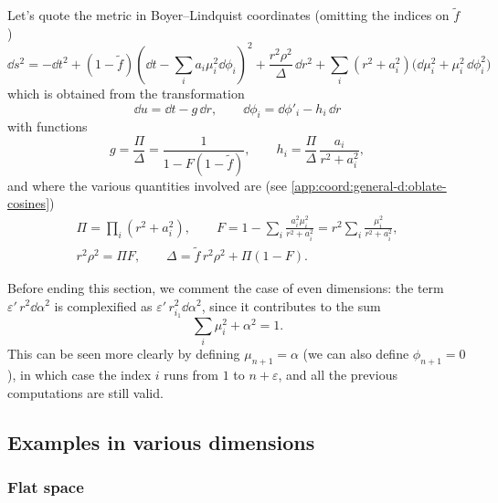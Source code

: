 Let's quote the metric in Boyer--Lindquist coordinates (omitting the indices on $\tilde f$)~\cite{Myers:1986:BlackHolesHigher}
\begin{equation}
	\label{higher-jna:metric:rotating:result-jna-bl}
	\dd s^2 = - \dd t^2
		+ (1 - \tilde f) \left(\dd t - \sum_i a_i \mu_i^2 \dd \phi_i \right)^2
		+ \frac{r^2 \rho^2}{\Delta}\, \dd r^2
		+ \sum_i (r^2 + a_i^2) \Big(\dd \mu_i^2 + \mu_i^2\, \dd \phi_i^2 \Big)
\end{equation} 
which is obtained from the transformation
\begin{equation}
	\dd u = \dd t - g\, \dd r, \qquad
	\dd \phi_i = \dd \phi'_i - h_i\, \dd r
\end{equation} 
with functions
\begin{equation}
\label{higher-jna:change:rotating:higher-dim-func-gh}
	g = \frac{\Pi}{\Delta}
		= \frac{1}{1 - F (1 - \tilde f)}, \qquad
	h_i = \frac{\Pi}{\Delta} \, \frac{a_i}{r^2 + a_i^2},
\end{equation}
and where the various quantities involved are (see \cref{app:coord:general-d:oblate-cosines})
\begin{equation}
	\label{higher-jna:metric:rotating:result-jna-bl-parameters}
	\begin{gathered}
		\Pi = \prod_i (r^2 + a_i^2), \qquad
		F = 1 - \sum_i \frac{a_i^2 \mu_i^2}{r^2 + a_i^2} = r^2 \sum_i \frac{\mu_i^2}{r^2 + a_i^2}, \\
		r^2 \rho^2 = \Pi F, \qquad
		\Delta = \tilde f\, r^2 \rho^2 + \Pi (1 - F).
	\end{gathered}
\end{equation}

Before ending this section, we comment the case of even dimensions: the term $\varepsilon'\, r^2 \dd \alpha^2$ is complexified as $\varepsilon'\, r_{i_1}^2 \dd \alpha^2$, since it contributes to the sum
\begin{equation}
	\sum_i \mu_i^2 + \alpha^2 = 1.
\end{equation} 
This can be seen more clearly by defining $\mu_{n+1} = \alpha$ (we can also define $\phi_{n+1} = 0$), in which case the index $i$ runs from $1$ to $n+\varepsilon$, and all the previous computations are still valid.


\subsection{Examples in various dimensions}
\label{sec:higher-jna:examples}


\subsubsection{Flat space}


